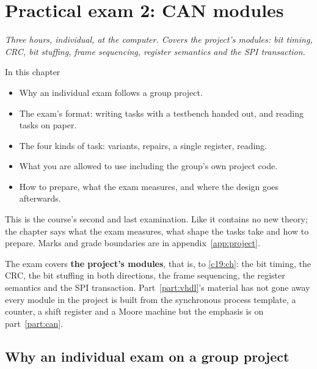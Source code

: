 
\chapter{Practical exam 2: CAN modules}
\label{c20:ch}

{\large\itshape Three hours, individual, at the computer. Covers the project's modules: bit timing,
CRC, bit stuffing, frame sequencing, register semantics and the SPI transaction.\par}

\begin{chapterbox}{In this chapter}
\begin{itemize}
  \item Why an individual exam follows a group project.
  \item The exam's format: writing tasks with a testbench handed out, and reading tasks on paper.
  \item The four kinds of task: variants, repairs, a single register, reading.
  \item What you are allowed to use \textemdash{} including the group's own project code.
  \item How to prepare, what the exam measures, and where the design goes afterwards.
\end{itemize}
\end{chapterbox}

This is the course's second and last examination. Like  it contains no new theory; the
chapter says what the exam measures, what shape the tasks take and how to prepare. Marks and grade
boundaries are in appendix~\ref{app:project}.

The exam covers \textbf{the project's modules}, that is,  to \ref{c19:ch}: the bit
timing, the CRC, the bit stuffing in both directions, the frame sequencing, the register semantics
and the SPI transaction. Part~\ref{part:vhdl}'s material has not gone away \textemdash{} every module
in the project is built from the synchronous process template, a counter, a shift register and a
Moore machine \textemdash{} but the emphasis is on part~\ref{part:can}.

\section{Why an individual exam on a group project}
\label{c20:sec:why}

